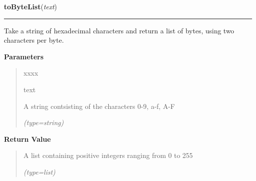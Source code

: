 \hspace{.8\funcindent}\begin{boxedminipage}{\funcwidth}

    \raggedright \textbf{toByteList}(\textit{text})

    \vspace{-1.5ex}

    \rule{\textwidth}{0.5\fboxrule}
\setlength{\parskip}{2ex}
    Take a string of hexadecimal characters and return a list of bytes, 
    using two characters per byte.

\setlength{\parskip}{1ex}
      \textbf{Parameters}
      \vspace{-1ex}

      \begin{quote}
        \begin{Ventry}{xxxx}

          \item[text]

          A string contsisting of the characters 0-9, a-f, A-F

            {\it (type=string)}

        \end{Ventry}

      \end{quote}

      \textbf{Return Value}
    \vspace{-1ex}

      \begin{quote}
      A list containing positive integers ranging from 0 to 255

      {\it (type=list)}

      \end{quote}

    \end{boxedminipage}

    \label{helpers:xor2Bytes}

    \vspace{0.5ex}

